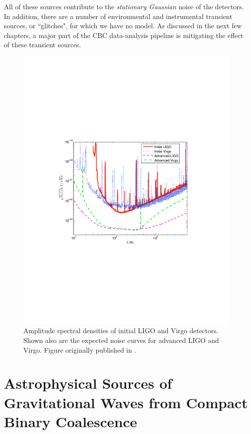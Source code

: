 All of these sources contribute to the \emph{stationary Gaussian} noise of the detectors. In addition, there are a number of environmental and instrumental transient sources, or ``glitches", for which we have no model. As discussed in the next few chapters, a major part of the \ac{CBC} data-analysis pipeline is mitigating the effect of these transient sources.

\begin{figure}[p]
\center
\includegraphics[width=6in]{figures/NoiseCurvesInitAdv.pdf}
\caption{Amplitude spectral densities of initial \ac{LIGO} and Virgo detectors. Shown also are the expected noise curves for advanced \ac{LIGO} and Virgo. Figure originally published in \cite{ref:rates}.}
\label{fig:init_AdvASD}
\end{figure}

\section{Astrophysical Sources of Gravitational Waves from Compact Binary Coalescence}

